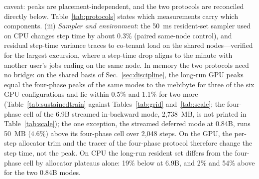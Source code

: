\documentclass[journal]{IEEEtran}
\begin{document}
caveat: peaks are placement-independent, and the two protocols are
reconciled directly below. Table~\ref{tab:protocols} states which
measurements carry which components. (iii) \emph{Sampler and environment}: the 50~ms
resident-set sampler used on CPU changes step time by about $0.3\%$
(paired same-node control), and residual step-time variance traces to
co-tenant load on the shared nodes---verified for the largest excursion,
where a step-time drop aligns to the minute with another user's jobs
ending on the same node.
In memory the two protocols need no bridge: on the shared basis of
Sec.~\ref{sec:discipline}, the long-run GPU peaks equal the four-phase
peaks of the same modes to the mebibyte for three of the six GPU
configurations and lie within 0.5\% and 1.1\% for two more (Table~\ref{tab:sustainedtrain}
against Tables~\ref{tab:grid} and~\ref{tab:scale}; the four-phase cell of
the 6.9B streamed in-backward mode, 2{,}738~MB, is not printed in
Table~\ref{tab:scale}); the one exception, the streamed deferred mode at
0.84B, runs 50~MB (4.6\%) above its four-phase cell over 2{,}048 steps.
On the GPU, the per-step allocator trim and the tracer of the four-phase
protocol therefore change the step time, not the peak. On CPU the long-run
resident set differs from the four-phase cell by allocator plateaus alone:
19\% below at 6.9B, and 2\% and 54\% above for the two 0.84B modes.
\end{document}
